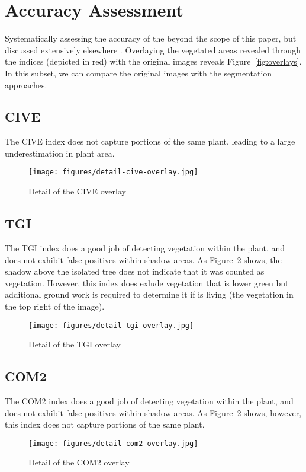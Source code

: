 \documentclass[letterpaper]{article}
\begin{document}
{{\section{Accuracy Assessment}
Systematically assessing the accuracy of the beyond the scope of this paper, but discussed extensively elsewhere \cite{Barati2011-oj}. Overlaying the vegetated areas revealed through the indices (depicted in red) with the original images reveals Figure~\ref{fig:overlays}. In this subset, we can compare the original images with the segmentation approaches.

\subsection{CIVE}
The CIVE index does not capture portions of the same plant, leading to a large underestimation in plant area.
\begin{figure}[H]
	\centering
	\texttt{[image: figures/detail-cive-overlay.jpg]}
	\caption{Detail of the CIVE overlay}
	\label{fig:detail-cive}
\end{figure}

\subsection{TGI}
The TGI index does a good job of detecting vegetation within the plant, and does not exhibit false positives within shadow areas. As Figure~\ref{fig:detail-tgi} shows, the shadow above the isolated tree does not indicate that it was counted as vegetation. However, this index does exlude vegetation that is lower green but additional ground work is required to determine it if is living (the vegetation in the top right of the image).
\begin{figure}[H]
	\centering
	\texttt{[image: figures/detail-tgi-overlay.jpg]}
	\caption{Detail of the TGI overlay}
	\label{fig:detail-tgi}
\end{figure}

\subsection{COM2}
The COM2 index does a good job of detecting vegetation within the plant, and does not exhibit false positives within shadow areas. As Figure~\ref{fig:detail-tgi} shows, however, this index does not capture portions of the same plant.
\begin{figure}[H]
	\centering
	\texttt{[image: figures/detail-com2-overlay.jpg]}
	\caption{Detail of the COM2 overlay}
	\label{fig:detail-com2}
\end{figure}

}}
\end{document}
